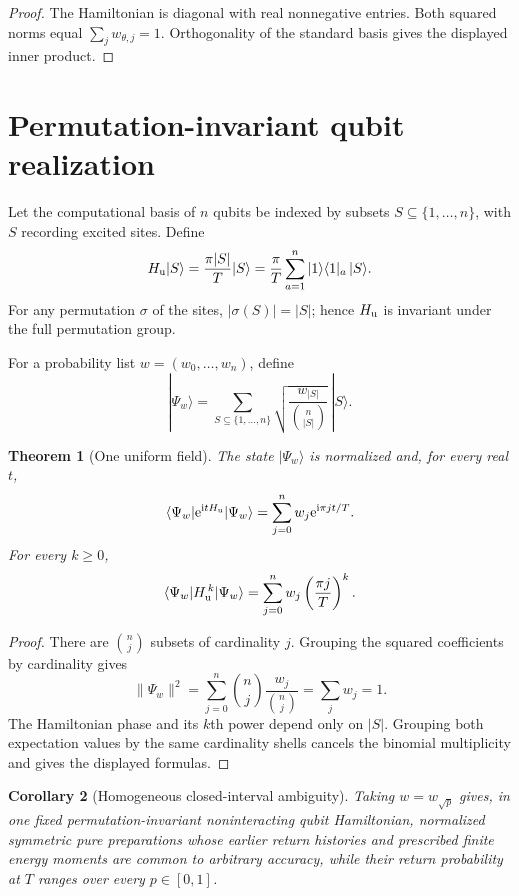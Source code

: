 \documentclass[12pt]{article}
\newtheorem{theorem}{Theorem}[section]
\newtheorem{corollary}[theorem]{Corollary}
\newcommand{\ee}{\mathrm e}
\newcommand{\ii}{\mathrm i}
\begin{document}
\begin{proof}
The Hamiltonian is diagonal with real nonnegative entries. Both squared
norms equal \(\sum_jw_{\theta,j}=1\). Orthogonality of the standard basis
gives the displayed inner product.
\end{proof}

\section{Permutation-invariant qubit realization}

Let the computational basis of \(n\) qubits be indexed by subsets
\(S\subseteq\{1,\ldots,n\}\), with \(S\) recording excited sites. Define
\[
 H_{\rm u}|S\rangle=\frac{\pi |S|}{T}|S\rangle
 =\frac{\pi}{T}\sum_{a=1}^{n}
 |1\rangle\langle1|_a\,|S\rangle .
\]
For any permutation \(\sigma\) of the sites,
\(|\sigma(S)|=|S|\); hence \(H_{\rm u}\) is invariant under the full
permutation group.

For a probability list \(w=(w_0,\ldots,w_n)\), define
\[
 |\Psi_w\rangle
 =\sum_{S\subseteq\{1,\ldots,n\}}
 \sqrt{\frac{w_{|S|}}{{n\choose |S|}}}\,|S\rangle .
\]

\begin{theorem}[One uniform field]
The state \(|\Psi_w\rangle\) is normalized and, for every real \(t\),
\[
 \langle\Psi_w|\ee^{\ii tH_{\rm u}}|\Psi_w\rangle
 =\sum_{j=0}^{n}w_j\ee^{\ii\pi jt/T}.
\]
For every \(k\geq0\),
\[
 \langle\Psi_w|H_{\rm u}^{\,k}|\Psi_w\rangle
 =\sum_{j=0}^{n}w_j\left(\frac{\pi j}{T}\right)^k.
\]
\end{theorem}

\begin{proof}
There are \({n\choose j}\) subsets of cardinality \(j\). Grouping the
squared coefficients by cardinality gives
\[
 \|\Psi_w\|^2
 =\sum_{j=0}^{n}{n\choose j}
 \frac{w_j}{{n\choose j}}=\sum_jw_j=1.
\]
The Hamiltonian phase and its \(k\)th power depend only on \(|S|\).
Grouping both expectation values by the same cardinality shells cancels
the binomial multiplicity and gives the displayed formulas.
\end{proof}

\begin{corollary}[Homogeneous closed-interval ambiguity]
Taking \(w=w_{\sqrt p}\) gives, in one fixed permutation-invariant
noninteracting qubit Hamiltonian, normalized symmetric pure preparations
whose earlier return histories and prescribed finite energy moments are
common to arbitrary accuracy, while their return probability at \(T\)
ranges over every \(p\in[0,1]\).
\end{corollary}
\end{document}
